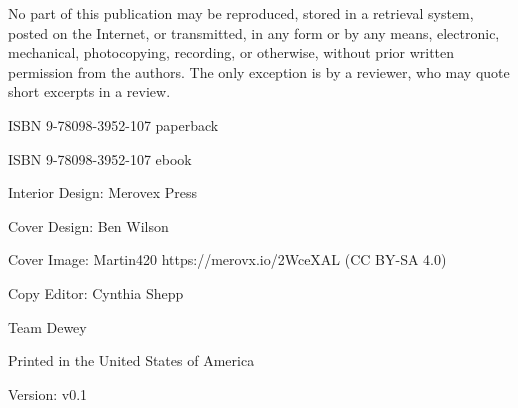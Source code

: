 \documentclass[9pt,]{book}
\begin{document}
  \footnotesize
  \par\noindent No part of this publication may be reproduced, stored in a retrieval
system, posted on the Internet, or transmitted, in any form or by any
means, electronic, mechanical, photocopying, recording, or otherwise,
without prior written permission from the authors. The only exception is
by a reviewer, who may quote short excerpts in a review.\newline

      \par\noindent ISBN 9-78098-3952-107 paperback
      \par\noindent ISBN 9-78098-3952-107 ebook
  \newline

  \footnotesize
  

  \par\noindent Interior Design: Merovex Press %
      \par\noindent Cover Design: Ben Wilson
      \par\noindent Cover Image: Martin420 https://merovx.io/2WceXAL (CC BY-SA 4.0)
      \par\noindent Copy Editor: Cynthia Shepp
  \newline

  \par\noindent       \par\noindent Team Dewey
    \newline

  
  \par\noindent Printed in the United States of America
  \newline

  
    \par\noindent Version: v0.1
    \vspace*{\fill}
  \clearpage\normalsize

  
              {
            \setcounter{tocdepth}{1}
      \tableofcontents
    }
      
      \listoftables
  
      \listoffigures
  
\newpage %
\end{document}

